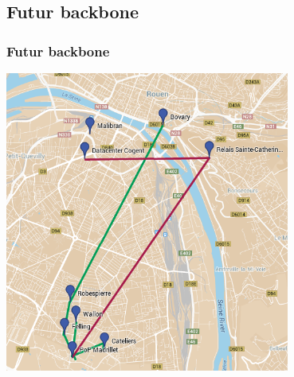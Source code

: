 \documentclass[handout]{beamer}
\begin{document}
	\subsection{Futur backbone}
		\begin{frame}
		\frametitle{Futur backbone}
		\vspace{-5px}
		\begin{center}
			\includegraphics[width=0.70\textwidth]{images/futurReseau.png}
		\end{center}
		
		\end{frame}

\end{document}
